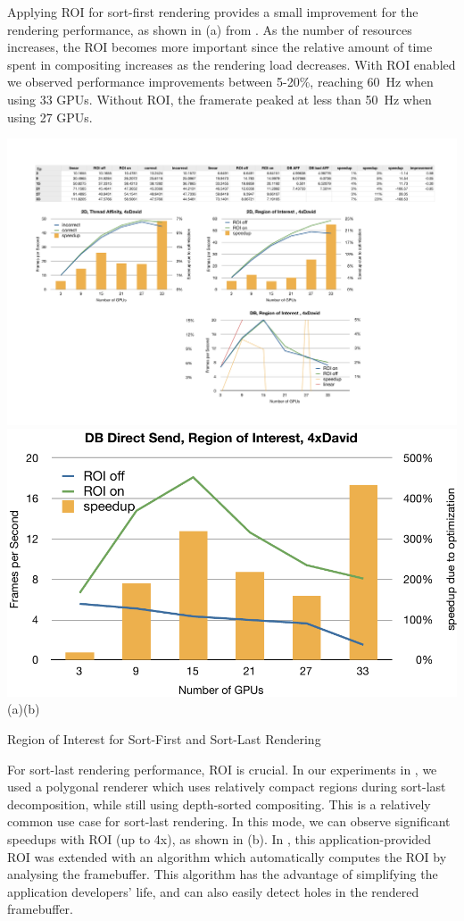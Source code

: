 Applying ROI for sort-first rendering provides a small improvement for the
rendering performance, as shown in (a) from \cite{EBAHMP:12}. As the
number of resources increases, the ROI becomes more important since the
relative amount of time spent in compositing increases as the rendering load
decreases. With ROI enabled we observed performance improvements between
5-20\%, reaching 60~Hz when using 33 GPUs. Without ROI, the framerate peaked at
less than 50~Hz when using 27 GPUs.

\begin{benchmark}[h!t]\center
    \includegraphics[width=.48\textwidth]{results/roiSF}\hfil
    \includegraphics[width=.48\textwidth]{results/roiSL}\\{\small(a)\hspace{.5\textwidth}(b)}\\
 {\caption{\label{rROI}Region of Interest for Sort-First and Sort-Last Rendering}}
\end{benchmark}

For sort-last rendering performance, ROI is crucial. In our experiments in
\cite{EBAHMP:12}, we used a polygonal renderer which uses relatively compact
regions during sort-last decomposition, while still using depth-sorted
compositing. This is a relatively common use case for sort-last rendering. In
this mode, we can observe significant speedups with ROI (up to 4x), as shown in
(b). In \cite{MEP:10}, this application-provided ROI was extended
with an algorithm which automatically computes the ROI by analysing the
framebuffer. This algorithm has the advantage of simplifying the application
developers' life, and can also easily detect holes in the rendered framebuffer.


